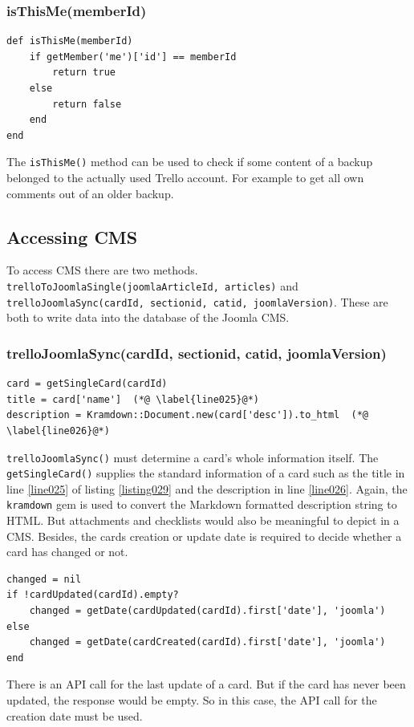 \subsubsection{isThisMe(memberId)}
\begin{lstlisting}[aboveskip=1\baselineskip, caption= isThisMe(), label=listing059]
def isThisMe(memberId)
	if getMember('me')['id'] == memberId
		return true
	else
		return false
	end
end
\end{lstlisting}

The \lstinline{isThisMe()} method can be used to check if some content of a backup belonged to the actually used Trello account. For example to get all own comments out of an older backup.

\subsection{Accessing CMS}
To access CMS there are two methods. \lstinline{trelloToJoomlaSingle(joomlaArticleId, articles)} and \lstinline{trelloJoomlaSync(cardId, sectionid, catid, joomlaVersion)}. These are both to write data into the database of the Joomla CMS.


\subsubsection{trelloJoomlaSync(cardId, sectionid, catid, joomlaVersion)}

\begin{lstlisting}[aboveskip=1\baselineskip, caption=Getting standard card information., label=listing029]
card = getSingleCard(cardId)
title = card['name']  (*@ \label{line025}@*)
description = Kramdown::Document.new(card['desc']).to_html  (*@ \label{line026}@*)
\end{lstlisting}

\lstinline{trelloJoomlaSync()} must determine a card's whole information itself. The \lstinline{getSingleCard()} supplies the standard information of a card such as the title in line \ref{line025} of listing \ref{listing029} and the description in line \ref{line026}. Again, the \texttt{kramdown} gem is used to convert the Markdown formatted description string to HTML. But attachments and checklists would also be meaningful to depict in a CMS. Besides, the cards creation or update date is required to decide whether a card has changed or not.

\begin{lstlisting}[aboveskip=1\baselineskip, caption=Getting the date of a cards last change., label=listing030]
changed = nil
if !cardUpdated(cardId).empty?
	changed = getDate(cardUpdated(cardId).first['date'], 'joomla')
else
	changed = getDate(cardCreated(cardId).first['date'], 'joomla')
end
\end{lstlisting}
There is an API call for the last update of a card. But if the card has never been updated, the response would be empty. So in this case, the API call for the creation date must be used.

